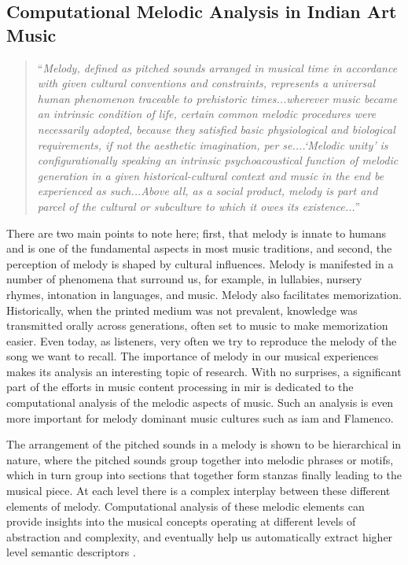 \subsection{Computational Melodic Analysis in Indian Art Music}
\label{sec:intro_melodic_analysis_IAM}


\blockcquote{ringer2001melody}{``\textit{Melody, defined as pitched sounds arranged in musical time in accordance with given cultural conventions and constraints, represents a universal human phenomenon traceable to prehistoric times...wherever music became an intrinsic condition of life, certain common melodic procedures were necessarily adopted, because they satisfied basic physiological and biological requirements, if not the aesthetic imagination, per se....`Melodic unity' is configurationally speaking an intrinsic psychoacoustical function of melodic generation in a given historical-cultural context and music in the end be experienced as such...Above all, as a social product, melody is part and parcel of the cultural or subculture to which it owes its existence...}''}

There are two main points to note here; first, that melody is innate to humans and is one of the fundamental aspects in most music traditions, and second, the perception of melody is shaped by cultural influences. Melody is manifested in a number of phenomena that surround us, for example, in lullabies, nursery rhymes, intonation in languages, and music. Melody also facilitates memorization. Historically, when the printed medium was not prevalent, knowledge was transmitted orally across generations, often set to music to make memorization easier. Even today, as listeners, very often we try to reproduce the melody of the song we want to recall. The importance of melody in our musical experiences makes its analysis an interesting topic of research. With no surprises, a significant part of the efforts in music content processing in \gls{mir} is dedicated to the computational analysis of the melodic aspects of music. Such an analysis is even more important for melody dominant music cultures such as \gls{iam} and Flamenco.

The arrangement of the pitched sounds in a melody is shown to be hierarchical in nature, where the pitched sounds group together into melodic phrases or motifs, which in turn group into sections that together form stanzas finally leading to the musical piece. At each level there is a complex interplay between these different elements of melody. Computational analysis of these melodic elements can provide insights into the musical concepts operating at different levels of abstraction and complexity, and eventually help us automatically extract higher level semantic descriptors .

